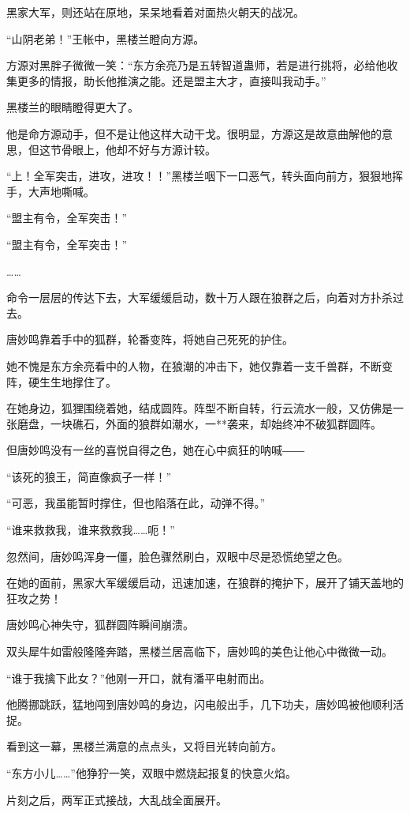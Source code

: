 \begin{this_body}
黑家大军，则还站在原地，呆呆地看着对面热火朝天的战况。

“山阴老弟！”王帐中，黑楼兰瞪向方源。

方源对黑胖子微微一笑：“东方余亮乃是五转智道蛊师，若是进行挑将，必给他收集更多的情报，助长他推演之能。还是盟主大才，直接叫我动手。”

黑楼兰的眼睛瞪得更大了。

他是命方源动手，但不是让他这样大动干戈。很明显，方源这是故意曲解他的意思，但这节骨眼上，他却不好与方源计较。

“上！全军突击，进攻，进攻！！”黑楼兰咽下一口恶气，转头面向前方，狠狠地挥手，大声地嘶喊。

“盟主有令，全军突击！”

“盟主有令，全军突击！”

……

命令一层层的传达下去，大军缓缓启动，数十万人跟在狼群之后，向着对方扑杀过去。

唐妙鸣靠着手中的狐群，轮番变阵，将她自己死死的护住。

她不愧是东方余亮看中的人物，在狼潮的冲击下，她仅靠着一支千兽群，不断变阵，硬生生地撑住了。

在她身边，狐狸围绕着她，结成圆阵。阵型不断自转，行云流水一般，又仿佛是一张磨盘，一块礁石，外面的狼群如潮水，一**袭来，却始终冲不破狐群圆阵。

但唐妙鸣没有一丝的喜悦自得之色，她在心中疯狂的呐喊――

“该死的狼王，简直像疯子一样！”

“可恶，我虽能暂时撑住，但也陷落在此，动弹不得。”

“谁来救救我，谁来救救我……呃！”

忽然间，唐妙鸣浑身一僵，脸色骤然刷白，双眼中尽是恐慌绝望之色。

在她的面前，黑家大军缓缓启动，迅速加速，在狼群的掩护下，展开了铺天盖地的狂攻之势！

唐妙鸣心神失守，狐群圆阵瞬间崩溃。

双头犀牛如雷般隆隆奔踏，黑楼兰居高临下，唐妙鸣的美色让他心中微微一动。

“谁于我擒下此女？”他刚一开口，就有潘平电射而出。

他腾挪跳跃，猛地闯到唐妙鸣的身边，闪电般出手，几下功夫，唐妙鸣被他顺利活捉。

看到这一幕，黑楼兰满意的点点头，又将目光转向前方。

“东方小儿……”他狰狞一笑，双眼中燃烧起报复的快意火焰。

片刻之后，两军正式接战，大乱战全面展开。


\end{this_body}
